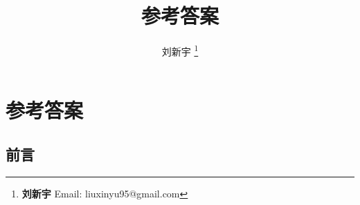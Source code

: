 \documentclass[UTF8]{article}
\begin{document}
\title{参考答案}

\author{刘新宇
\thanks{{\bfseries 刘新宇} \newline
  Email: liuxinyu95@gmail.com \newline}
  }

\maketitle
\fi


\chapter*{参考答案}

\section{前言}
\end{document}
